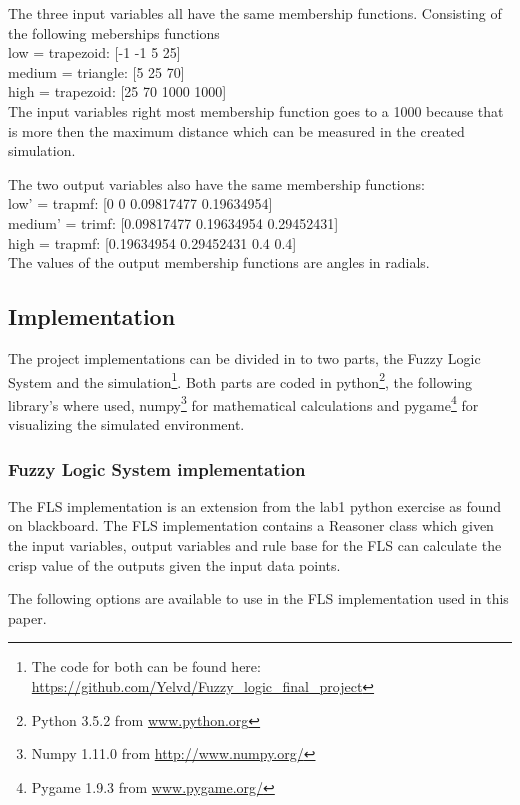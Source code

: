 \documentclass[conference]{IEEEtran}
\begin{document}
The three input variables all have the same membership functions. Consisting of the following meberships functions\\
low = trapezoid: [-1 -1 5 25]\\
medium = triangle: [5 25 70]\\
high = trapezoid: [25 70 1000 1000]\\
The input variables right most membership function goes to a 1000 because that is more then the maximum distance which can be measured in the created simulation.

The two output variables also have the same membership functions:\\
low' = trapmf: [0 0 0.09817477 0.19634954]\\
medium' = trimf: [0.09817477 0.19634954 0.29452431]\\
high = trapmf: [0.19634954 0.29452431 0.4 0.4]\\
The values of the output membership functions are angles in radials.


\subsection{Implementation}
The project implementations can be divided in to two parts, the Fuzzy Logic System and the simulation\footnote{The code for both can be found here: \url{https://github.com/Yelvd/Fuzzy_logic_final_project}}. Both parts are coded in python\footnote{Python 3.5.2 from \url{www.python.org}}, the following library's where used, numpy\footnote{Numpy 1.11.0 from \url{http://www.numpy.org/}} for mathematical calculations and pygame\footnote{Pygame 1.9.3 from \url{www.pygame.org/}} for visualizing the simulated environment.

\subsubsection*{Fuzzy Logic System implementation}

The FLS implementation is an extension from the lab1 python exercise as found on blackboard. The FLS implementation contains a Reasoner class which given the input variables, output variables and rule base for the FLS can calculate the crisp value of the outputs given the input data points.

The following options are available to use in the FLS implementation used in this paper.
\end{document}
